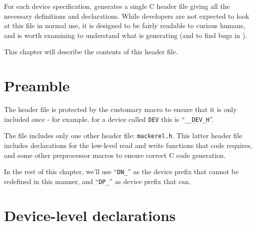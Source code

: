 \documentclass[a4paper,11pt,twoside]{report}
\begin{document}
For each device specification, \Mac generates a single C header file
giving all the necessary definitions and declarations.   While
developers are not expected to look at this file in normal use, it is
designed to be fairly readable to curious humans, and is worth
examining to understand what \Mac is generating (and to find bugs in
\Mac). 

This chapter will describe the contents of this header file. 

\section{Preamble}

The header file is protected by the customary macro to ensure that it
is only included once - for example, for a device called \texttt{DEV} this is
``\texttt{\_\_DEV\_H}''. 

The file includes only one other header file: \texttt{mackerel.h}.
This latter header file includes declarations for the low-level read
and write functions that \Mac code requires, and some other
preprocessor macros to ensure correct C code generation.   







In the rest of this chapter, we'll use ``\texttt{DN\_}'' as the
device prefix that cannot be redefined in this manner, and ``\texttt{DP\_}''
as device prefix that can. 

\section{Device-level declarations}
\end{document}
